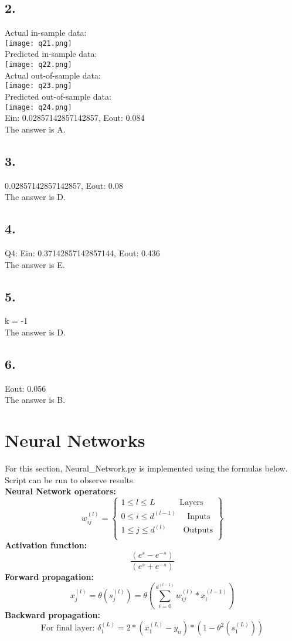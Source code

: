 \documentclass{homework}
\begin{document}
\subsection*{2.} 
Actual in-sample data: \\
\texttt{[image: q21.png]}\\
Predicted in-sample data: \\
\texttt{[image: q22.png]}\\

Actual out-of-sample data: \\
\texttt{[image: q23.png]}\\
Predicted out-of-sample data: \\
\texttt{[image: q24.png]}\\

Ein: 0.02857142857142857, Eout: 0.084 \\
The answer is A.
\subsection*{3.} 
0.02857142857142857, Eout: 0.08 \\
The answer is D.
\subsection*{4.} 
Q4: Ein: 0.37142857142857144, Eout: 0.436 \\
The answer is E.
\subsection*{5.} 
k = -1 \\
The answer is D.
\subsection*{6.} 
Eout: 0.056 \\
The answer is B.

\section*{Neural Networks}
For this section, Neural\_Network.py is implemented using the formulas below. Script can be run to observe results.\\
\textbf{Neural Network operators:}\\
\[
w_{ij}^{(l)} =
\left\{
	\begin{array}{ll}
		  1 \leq l \leq L \text{ ~~~~~~~~Layers}  \\
		  0 \leq i \leq d^{(l - 1)} \text{ ~~~Inputs}  \\
            1 \leq j \leq d^{(l)} \text{ ~~~~~Outputs}  \\
	\end{array}
\right\}
\]
\textbf{Activation function: }
\[\frac{(e^s - e^{-s})}{(e^s + e^{-s})} \]
\textbf{Forward propagation: }
\[x_j^{(l)} = \theta(s_j^{(l)}) = \theta(\sum_{i = 0}^{d^{(l - 1)}} w_{ij}^{(l)} * x_i^{(l - 1)})\]
\textbf{Backward propagation: }\\
\[\text{For final layer: } \delta_1^{(L)} = 2*(x_1^{(L)} - y_n)*(1 - \theta^2(s_1^{(L)}))\]
\end{document}
